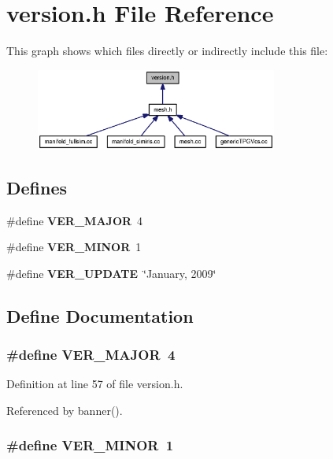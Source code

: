 \section{version.h File Reference}
\label{version_8h}


This graph shows which files directly or indirectly include this file:\nopagebreak
\begin{figure}[H]
\begin{center}
\leavevmode
\includegraphics[width=225pt]{version_8h__dep__incl}
\end{center}
\end{figure}
\subsection*{Defines}
\begin{CompactItemize}
\item 
\#define {\bf VER\_\-MAJOR}~4
\item 
\#define {\bf VER\_\-MINOR}~1
\item 
\#define {\bf VER\_\-UPDATE}~\char`\"{}January, 2009\char`\"{}
\end{CompactItemize}


\subsection{Define Documentation}
\subsubsection[{VER\_\-MAJOR}]{\setlength{\rightskip}{0pt plus 5cm}\#define VER\_\-MAJOR~4}\label{version_8h_e9b0873c1004a01651f733d556db118c}




Definition at line 57 of file version.h.

Referenced by banner().
\subsubsection[{VER\_\-MINOR}]{\setlength{\rightskip}{0pt plus 5cm}\#define VER\_\-MINOR~1}\label{version_8h_d78650efa42849c5f86d372f11f26403}





